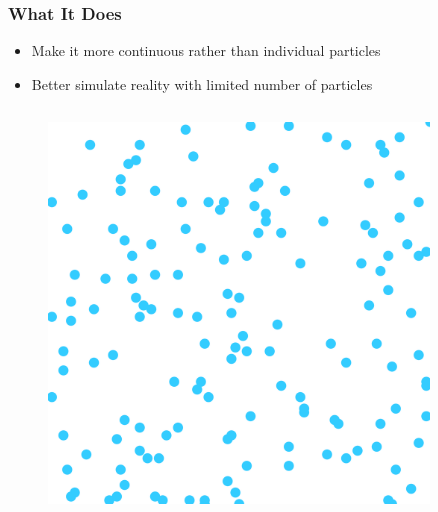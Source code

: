 \documentclass[aspectratio=169]{beamer}
\begin{document}
\begin{frame}
\frametitle{What It Does}
\begin{itemize}
\item Make it more continuous rather than individual particles
\item Better simulate reality with limited number of particles
\end{itemize}


\begin{columns}
\begin{column}{0.32\textwidth}
\begin{figure}
\includegraphics[width=0.9\textwidth]{pictures/particles.png}
\end{figure}
\end{column}


\end{columns}
\end{frame}
\end{document}
